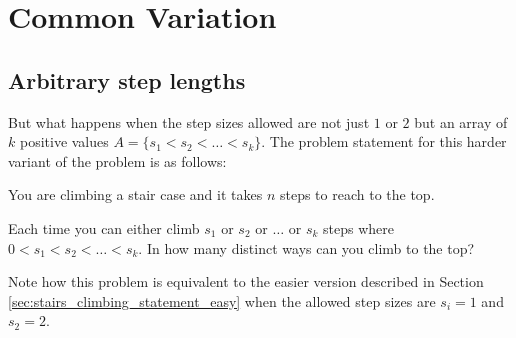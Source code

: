 \section{Common Variation
}
\subsection{Arbitrary step lengths}
\label{stairs_climbing:sec:arbitrary_steps}
But what happens when the step sizes allowed are not just $1$ or $2$ but an array of $k$ positive values $A=\{s_1 < s_2 < \ldots < s_k\}$. The problem statement for this harder variant of the problem is as follows:

\begin{exercise}
You are climbing a stair case and it takes $n$ steps to reach to the top.

Each time you can either climb $s_1$ or $s_2$ or $\ldots$ or $s_k$ steps where $0 < s_1 < s_2 < \ldots < s_k$. In how many distinct ways can you climb to the top?
\end{exercise}

Note how this problem is equivalent to the easier version described in Section \ref{sec:stairs_climbing_statement_easy} when the allowed step sizes are $s_i = 1$ and $s_2=2$.

